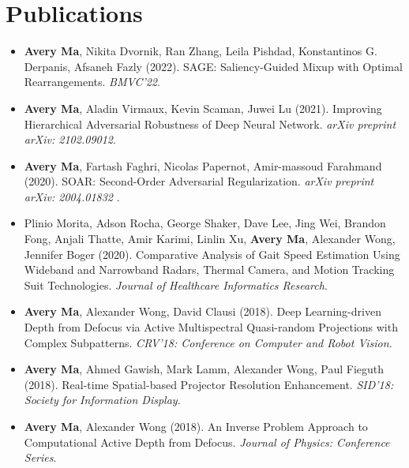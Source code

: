 \section*{Publications}
    \vspace{\postsubhead}
    \begin{adjustwidth}{\indentleft}{\indentright}
        \begin{itemize}
            \setlength\itemsep{0.6em}
            
            \item \textbf{Avery Ma}, Nikita Dvornik, Ran Zhang, Leila Pishdad, Konstantinos G. Derpanis, Afsaneh Fazly (2022). SAGE: Saliency-Guided Mixup with Optimal Rearrangements. \emph{BMVC'22}.
            
            \item \textbf{Avery Ma}, Aladin Virmaux, Kevin Scaman, Juwei Lu (2021). Improving Hierarchical Adversarial Robustness of Deep Neural Network. \emph{arXiv preprint arXiv: 2102.09012}.
            
            \item \textbf{Avery Ma}, Fartash Faghri, Nicolas Papernot, Amir-massoud Farahmand (2020). SOAR: Second-Order Adversarial Regularization. \emph{arXiv preprint arXiv: 2004.01832} .
            
            \item Plinio Morita, Adson Rocha, George Shaker, Dave Lee, Jing Wei, Brandon Fong, Anjali Thatte, Amir Karimi, Linlin Xu, \textbf{Avery Ma}, Alexander Wong, Jennifer Boger (2020). Comparative Analysis of Gait Speed Estimation Using Wideband and Narrowband Radars, Thermal Camera, and Motion Tracking Suit Technologies. \emph{Journal of Healthcare Informatics Research}.
            
            \item \textbf{Avery Ma}, Alexander Wong, David Clausi (2018). Deep Learning-driven Depth from Defocus via Active Multispectral Quasi-random Projections with Complex Subpatterns. \emph{CRV'18: Conference on Computer and Robot Vision}.
            
            \item \textbf{Avery Ma}, Ahmed Gawish, Mark Lamm, Alexander Wong, Paul Fieguth (2018). Real-time Spatial-based Projector Resolution Enhancement. \emph{SID'18: Society for Information Display}.
            
            \item \textbf{Avery Ma}, Alexander Wong (2018). An Inverse Problem Approach to Computational Active Depth from Defocus. \emph{Journal of Physics: Conference Series}.
            

\end{itemize}
\end{adjustwidth}
